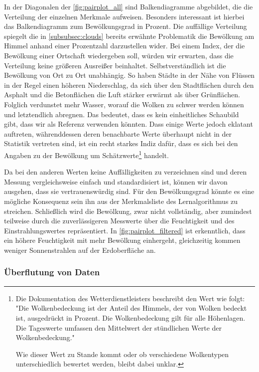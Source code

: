 \documentclass[12pt, a4paper]{article}
\begin{document}
In der Diagonalen der \autoref{fig:pairplot_all} sind Balkendiagramme abgebildet, die die Verteilung der einzelnen Merkmale aufweisen. Besonders interessant ist hierbei das Balkendiagramm zum Bewölkungsgrad in Prozent. Die auffällige Verteilung spiegelt die in \autoref{subsubsec:clouds} bereits erwähnte Problematik die Bewölkung am Himmel anhand einer Prozentzahl darzustellen wider. Bei einem Index, der die Bewölkung einer Ortschaft wiedergeben soll, würden wir erwarten, dass die Verteilung keine größeren Ausreißer beinhaltet. Selbstverständlich ist die Bewölkung von Ort zu Ort unabhängig. So haben Städte in der Nähe von Flüssen in der Regel einen höheren Niederschlag, da sich über den Stadtflächen durch den Asphalt und die Betonflächen die Luft stärker erwärmt als über Grünflächen. Folglich verdunstet mehr Wasser, worauf die Wolken zu schwer werden können und letztendlich abregnen. Das bedeutet, dass es kein einheitliches Schaubild gibt, dass wir als Referenz verwenden könnten. Dass einige Werte jedoch eklatant auftreten, währenddessen deren benachbarte Werte überhaupt nicht in der Statistik vertreten sind, ist ein recht starkes Indiz dafür, dass es sich bei den Angaben zu der Bewölkung um Schätzwerte\footnote{Die Dokumentation des Wetterdienstleisters beschreibt den Wert wie folgt: "Die Wolkenbedeckung ist der Anteil des Himmels, der von Wolken bedeckt ist, ausgedrückt in Prozent. Die Wolkenbedeckung gilt für alle Höhenlagen. Die Tageswerte umfassen den Mittelwert der stündlichen Werte der Wolkenbedeckung."

Wie dieser Wert zu Stande kommt oder ob verschiedene Wolkentypen unterschiedlich bewertet werden, bleibt dabei unklar.} handelt.

Da bei den anderen Werten keine Auffälligkeiten zu verzeichnen sind und deren Messung vergleichsweise einfach und standardisiert ist, können wir davon ausgehen, dass sie vertrauenswürdig sind. Für den Bewölkungsgrad könnte es eine mögliche Konsequenz sein ihn aus der Merkmalsliste des Lernalgorithmus zu streichen. Schließlich wird die Bewölkung, zwar nicht vollständig, aber zumindest teilweise durch die zuverlässigeren Messwerte über die Feuchtigkeit und des Einstrahlungswertes repräsentiert. In \autoref{fig:pairplot_filtered} ist erkenntlich, dass ein höhere Feuchtigkeit mit mehr Bewölkung einhergeht, gleichzeitig kommen weniger Sonnenstrahlen auf der Erdoberfläche an. 

\subsubsection{Überflutung von Daten}
\end{document}
